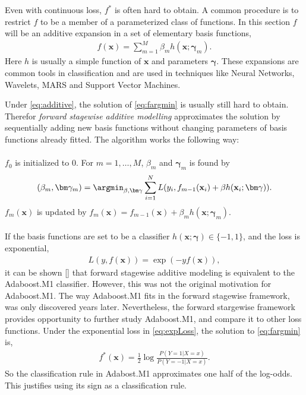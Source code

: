 Even with continuous loss, $f^*$ is often hard to obtain. A common procedure is to restrict $f$ to be a member of a parameterized class of functions. In this section $f$ will be an additive expansion in a set of elementary basis functions,
\begin{align}
  \label{eq:additive} 
  f(\mathbf{x}) =  \sum^{M}_{m=1} \beta_m h(\mathbf{x}; \bm{\gamma}_m).
\end{align}
Here $h$ is usually a simple function of $\mathbf{x}$ and parameters $\bm{\gamma}$. These expansions are common tools in classification and are used in techniques like Neural Networks, Wavelets, MARS and Support Vector Machines.

Under \eqref{eq:additive}, the solution of \eqref{eq:fargmin} is usually still hard to obtain. Therefor \textit{forward stagewise additive modelling} approximates the solution by sequentially adding new basis functions without changing parameters of basis functions already fitted. The algorithm works the following way:\\
\\
$f_0$ is initialized to 0. For $m = 1, \ldots, M$, $\beta_m$ and $\bm \gamma_m$ is found by
\begin{align}
  \label{eq:forStageWise} 
  (\beta_m, \bm \gamma_m) = \argmin_{\beta, \bm \gamma} \sum^{N}_{i=1} L(y_i, f_{m-1}(\mathbf{x}_i) + \beta h(\mathbf{x}_i; \bm \gamma)).
\end{align}
$f_m(\mathbf{x})$ is updated by $f_m(\mathbf{x}) = f_{m-1}(\mathbf{x}) + \beta_m h(\mathbf{x}; \bm \gamma_m)$.\\
\\
If the basis functions are set to be a classifier $h(\mathbf{x}; \bm \gamma) \in \{-1, 1\}$, and the loss is exponential,
\begin{align}
  \label{eq:expLoss} 
  L(y, f(\mathbf{x})) = \exp (-y f(\mathbf{x})),
\end{align}
it can be shown [\cite{modstat}] that forward stagewise additive modeling is equivalent to the Adaboost.M1 classifier. However, this was not the original motivation for Adaboost.M1. The way Adaboost.M1 fits in the forward stagewise framework, was only discovered years later. Nevertheless, the forward stargewise framework provides opportunity to further study Adaboost.M1, and compare it to other loss functions. Under the exponential loss in \eqref{eq:expLoss}, the solution to \eqref{eq:fargmin} is,
\begin{align}
  f^*( \mathbf{x}) = \frac{1}{2} \log \frac{P(Y=1 |X=x)}{P(Y=-1 | X = x)} .
\end{align}
So the classification rule in Adabost.M1 approximates one half of the log-odds. This justifies using its sign as a classification rule.
%
